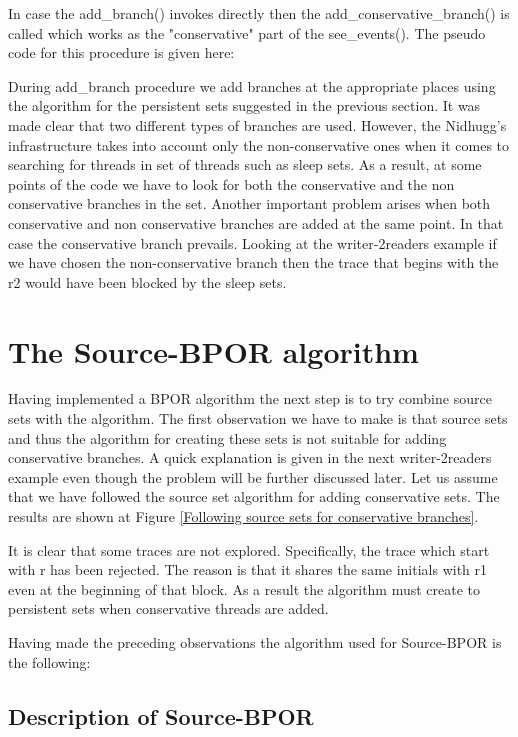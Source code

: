 In case the add\_branch() invokes directly then the add\_conservative\_branch() is called which works as the "conservative" part of the see\_events().
The pseudo code for this procedure is given here:

During add\_branch procedure we add branches at the appropriate places using the algorithm for the persistent sets suggested in the previous section.
It was made clear that two different types of branches are used. However, the Nidhugg's infrastructure takes into account only the non-conservative ones when it comes
to searching for threads in set of threads such as sleep sets. As a result, at some points of the code we have to look for both the conservative and the non conservative
branches in the set. 
Another important problem arises when both conservative and non conservative branches are added at the same point. In that case the conservative branch prevails.
Looking at the writer-2readers example if we have chosen the non-conservative branch then the trace that begins with the r2 would have been blocked by the sleep sets.

\section{The Source-BPOR algorithm}
Having implemented a BPOR algorithm the next step is to try combine source sets with the algorithm. The first observation we have to make is that
source sets and thus the algorithm for creating these sets is not suitable for adding conservative branches. A quick explanation is given in the next writer-2readers example
even though the problem will be further discussed later. Let us assume that we have followed the source set algorithm for adding conservative sets. 
The results are shown at Figure \ref{Following source sets for conservative branches}.


It is clear that some traces are not explored. Specifically, the trace which start with r has been rejected. The reason is that it shares the same initials with r1 even at the
beginning of that block. As a result the algorithm must create to persistent sets when conservative threads are added. 

Having made the preceding observations the algorithm used for Source-BPOR is the following:

\subsection{Description of Source-BPOR}

